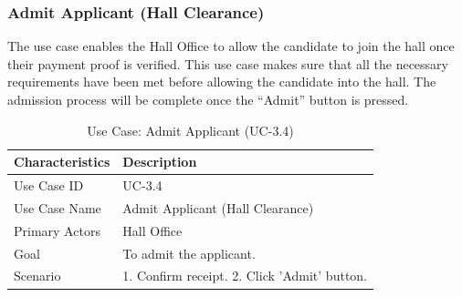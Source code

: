 \subsubsection{Admit Applicant (Hall Clearance)}
The use case enables the Hall Office to allow the candidate to join the hall once their payment proof is verified. This use case makes sure that all the necessary requirements have been met before allowing the candidate into the hall. The admission process will be complete once the “Admit” button is pressed.
\begin{table}[H]
    \centering
    \small
    \renewcommand{\arraystretch}{1.4}
    \caption{Use Case: Admit Applicant (UC-3.4)}
    \label{tab:hall_admit_applicant}
    
    \begin{tabularx}{\textwidth}{|l|X|}
        \hline
        \rowcolor[gray]{0.9} {Characteristics} & {Description} \\ \hline
        Use Case ID & UC-3.4 \\ \hline
        Use Case Name & Admit Applicant (Hall Clearance) \\ \hline
        Primary Actors & Hall Office \\ \hline
        Goal & To admit the applicant. \\ \hline
        Scenario & 1. Confirm receipt. 2. Click 'Admit' button. \\ \hline
    \end{tabularx}
\end{table}
\FloatBarrier